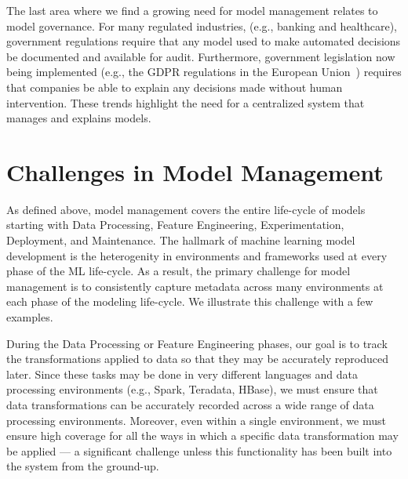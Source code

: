 \documentclass[11pt]{article}
\begin{document}
The last area where we find a growing need for model management relates to model governance. 
For many regulated industries, (e.g., banking and healthcare), government regulations require that any model used to make automated decisions be documented and available for audit. 
Furthermore, government legislation now being implemented (e.g., the GDPR regulations in the European Union~\cite{gdpr}) requires that companies be able to explain any decisions made without human intervention.
These trends highlight the need for a centralized system that manages and explains models.

\section{Challenges in Model Management}
\label{sec:challenges}

As defined above, model management covers the entire life-cycle of models starting with Data Processing, Feature Engineering, Experimentation, Deployment, and Maintenance.
The hallmark of machine learning model development is the heterogenity in environments and frameworks used at every phase of the ML life-cycle.
As a result, the primary challenge for model management is to consistently capture metadata across many environments at each phase of the modeling life-cycle.
We illustrate this challenge with a few examples.

During the Data Processing or Feature Engineering phases, our goal is to track the
transformations applied to data so that they may be accurately reproduced later.
Since these tasks may be done in very different languages and data processing environments (e.g., Spark, Teradata, HBase), we must ensure that data transformations can be accurately recorded across a wide range of data processing environments.
Moreover, even within a single environment, we must ensure high coverage for all the ways in which a specific data transformation may be applied --- a significant challenge unless this functionality has been built into the system from the ground-up.
\end{document}
